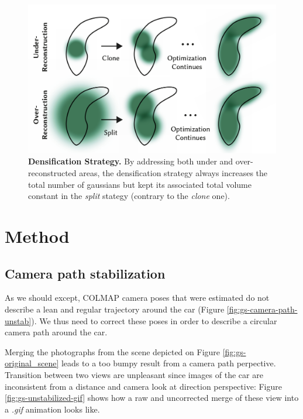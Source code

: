 \begin{figure}[htb!]
  \center
\includegraphics[width=.7\linewidth]{images/gaussiansplatting/densification-strategy.png}
\caption{\textbf{Densification Strategy.} By addressing both under and over-reconstructed areas, the densification strategy always increases the total number of gaussians but kept its associated total volume  constant in the \textit{split} stategy (contrary to the \textit{clone} one).}
\label{fig:gs-densification}
\end{figure}



\section{Method}
\subsection{Camera path stabilization}

As we should except, COLMAP camera poses that were estimated do not describe a lean and regular trajectory around the car (Figure \ref{fig:gs-camera-path-unstab}). We thus need to correct these poses in order to describe a circular camera path around the car. 


Merging the photographs from the scene depicted on Figure \ref{fig:gs-original_scene} leads to a too bumpy result from a camera path perpective. Transition between two views are unpleasant since images of the car are inconsistent from a distance and camera look at direction perspective: Figure \ref{fig:gs-unstabilized-gif} shows how a raw and uncorrected merge of these view into a \textit{.gif} animation looks like. 

\begin{center}
  \label{fig:gs-unstabilized-gif}
\end{center}

